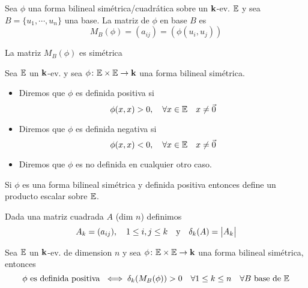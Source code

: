 \begin{defi}
	Sea $\phi$ una forma bilineal simétrica/cuadrática sobre un $\mathbf{k}$-ev. $\mathbb{E}$ y sea
	$B = \{u_1, \cdots, u_n \}$ una base. La matriz de $\phi$ en base $B$ es
	\[
		M_B(\phi) = (a_{ij}) = (\phi(u_i,u_j))
	\]
\end{defi}
\begin{obs}
	La matriz $M_B(\phi)$ es simétrica
\end{obs}
\begin{defi}
	Sea $\mathbb{E}$ un $\mathbf{k}$-ev. y sea $\phi \colon \mathbb{E} \times \mathbb{E} \to \mathbf{k}$ una
	forma bilineal simétrica.
	\begin{itemize}
		\item Diremos que $\phi$ es definida positiva si 
		\[ \phi(x,x) > 0, \quad \forall x \in \mathbb{E}
		\quad x \neq \vec{0} \]
		\item Diremos que $\phi$ es definida negativa si
		\[ \phi(x,x) < 0, \quad \forall x \in \mathbb{E}
		\quad x \neq \vec{0} \]
		\item Diremos que $\phi$ es no definida en cualquier otro caso.
	\end{itemize}
\end{defi}
\begin{obs}
	Si $\phi$ es una forma bilineal simétrica y definida positiva
	entonces define un producto escalar sobre $\mathbb{E}$.
\end{obs}
\begin{defi}
	Dada una matriz cuadrada $A$ (dim $n$) definimos
	\[
		A_k = (a_{ij}), \quad 1 \leq i, j \leq k \quad \text{y}
		\quad \delta_k(A) = \begin{vmatrix}A_k\end{vmatrix}
	\]
\end{defi}
\begin{thm}[de Sylvester]
	Sea $\mathbb{E}$ un $\mathbf{k}$-ev. de dimension $n$ y sea
	$\phi \colon \mathbb{E}\times \mathbb{E} \to \mathbf{k}$ una forma bilineal simétrica,
	entonces
	\[
	\phi \text{ es definida positiva }\iff \delta_k(M_B(\phi)) > 0
	\quad\forall 1 \leq k \leq n \quad\forall B \text{ base de } \mathbb{E}
	\]
\end{thm}
